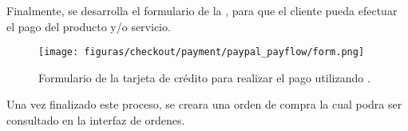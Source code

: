 		Finalmente, se desarrolla el formulario de la , para que el cliente pueda efectuar el pago del producto y/o servicio.

		\begin{figure}[H]
			\centering
			\texttt{[image: figuras/checkout/payment/paypal\_payflow/form.png]}
			\caption{Formulario de la tarjeta de crédito para realizar el pago utilizando \PPPaymentProNAME.}
			\label{figure:checkout:payment:paypal_payflow:form}
		\end{figure}

		Una vez finalizado este proceso, se creara una orden de compra la cual podra ser consultado en la interfaz de ordenes.